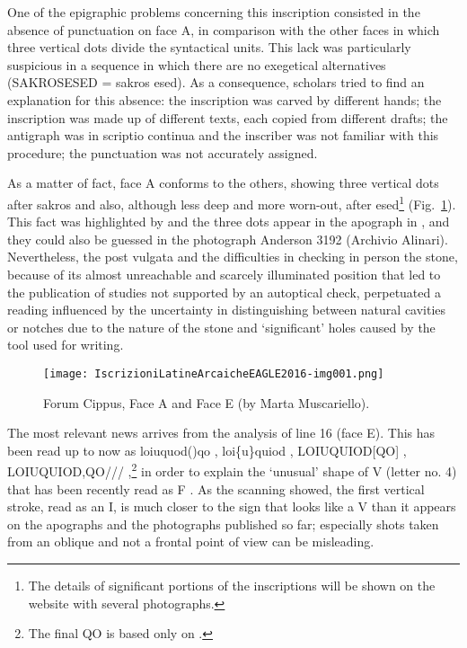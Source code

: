 \documentclass[amsthm,ebook]{saparticle}
\begin{document}
One of the epigraphic problems concerning this inscription consisted in the absence of punctuation on face A, in
comparison with the other faces in which three vertical dots divide the syntactical units. This lack was particularly
suspicious in a sequence in which there are no exegetical alternatives (SAKROSESED = sakros esed). As a consequence,
scholars tried to find an explanation for this absence: the inscription was carved by different hands; the inscription
was made up of different texts, each copied from different drafts; the antigraph was in scriptio continua and the
inscriber was not familiar with this procedure; the punctuation was not accurately assigned.

As a matter of fact, face A conforms to the others, showing three vertical dots after sakros and also, although less
deep and more worn-out, after esed\footnote{The details of significant portions of the inscriptions will be shown on
the website with several photographs. } (Fig.~\ref{fig:1}). This fact was highlighted by \citet{gamurrini_paleografia_1899} and the three dots
appear in the apograph in \citet[col. 1003]{hulsen_neue_1899},  and they could also be guessed in the photograph Anderson 3192
(Archivio Alinari). Nevertheless, the post \citet{goidanich_rapporti_1943} vulgata and the difficulties in checking in person the
stone, because of its almost unreachable and scarcely illuminated position that led to the publication of studies not
supported by an autoptical check, perpetuated a reading influenced by the uncertainty in distinguishing between natural
cavities or notches due to the nature of the stone and `significant' holes caused by the tool used for writing. 

\begin{figure}[!bp]
\centering
 \texttt{[image: IscrizioniLatineArcaicheEAGLE2016-img001.png]}
\caption{Forum Cippus, Face A and Face E (by Marta Muscariello).}
\label{fig:1}
\end{figure}





The most relevant news arrives from the analysis of line 16 (face E). This has been read up to now as loiuquod()qo
\citep{wachter_altlateinische_1987}, loi\{u\}quiod \citep{_studies_1993}, LOIUQUIOD[QO] \citep{baldi_foundations_2002}, LOIUQUIOD,QO/// \citep{hartmann_fruhlateinischen_2005},\footnote{The
final QO is based only on \citet{goidanich_rapporti_1943}.} in order to explain the `unusual' shape of V (letter no. 4) that has
been recently read as F \citep{prosdocimi_roma_2010}. As the scanning showed, the first vertical stroke, read as an I, is much
closer to the sign that looks like a V than it appears on the apographs and the photographs published so far;
especially shots taken from an oblique and not a frontal point of view can be misleading. 
\end{document}
